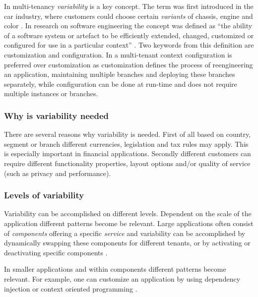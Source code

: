 In multi-tenancy \textit{variability} is a key concept. The term was first introduced in the car industry, where customers could choose certain \textit{variants} of chassis, engine and color \cite[p. 153]{kabbedijk2011variability}. 
In research on software engineering the concept was defined as ``the ability of a software system or artefact to be efficiently extended, changed, customized or configured for use in a particular context'' \cite{svahnberg2005taxonomy}.
Two keywords from this definition are customization and configuration. In a multi-tenant context configuration is preferred over customization \cite{sun2008software} as customization defines the process of reengineering an application, maintaining multiple branches and deploying these branches separately, while configuration can be done at run-time and does not require multiple instances or branches.

\subsubsection{Why is variability needed}
There are several reasons why variability is needed. 
First of all based on country, segment or branch different currencies, legislation and tax rules may apply. This is especially important in financial applications. 
Secondly different customers can require different functionality properties, layout options and/or quality of service (such as privacy and performance).

\subsubsection{Levels of variability}
Variability can be accomplished on different levels. 
Dependent on the scale of the application different patterns become be relevant. Large applications often consist of \textit{components} offering a specific \textit{service} and variability can be accomplished by dynamically swapping these components for different tenants, or by activating or deactivating specific components \cite{mietzner2008defining}. 

In smaller applications and within components different patterns become relevant. For example, one can customize an application by using dependency injection \cite{walraven2011middleware} or context oriented programming \cite{truyen2012context}.

